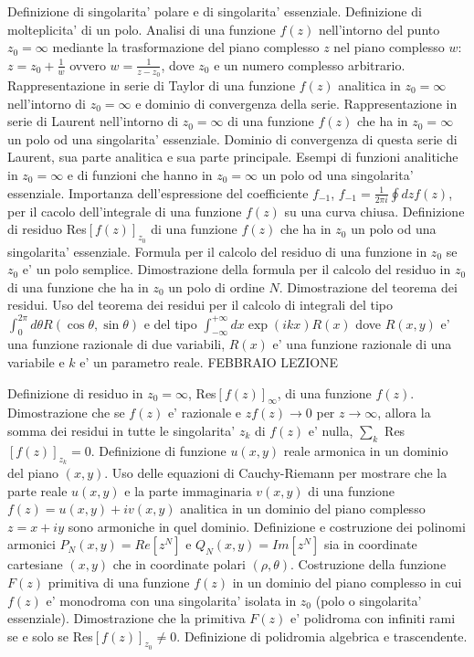 \documentclass[,12pt]{article}
\begin{document}
\noindent
Definizione di singolarita' polare e di singolarita' essenziale.
Definizione di molteplicita' di un polo. Analisi di una funzione
$f(z)$ nell'intorno del punto
$z_0=\infty$ mediante la trasformazione del piano complesso $z$ nel piano
complesso
$w$: $z=z_0+\frac{1}{w}$ ovvero $w=\frac{1}{z-z_0}$, dove $z_0$ e un
numero complesso arbitrario. Rappresentazione in serie di Taylor di una
funzione $f(z)$ analitica in $z_0=\infty$ nell'intorno di $z_0=\infty$ e
dominio di convergenza della serie. Rappresentazione in serie di Laurent
nell'intorno di $z_0=\infty$ di una funzione $f(z)$ che ha in $z_0=\infty$
un polo od una singolarita' essenziale. Dominio di convergenza di
questa serie di Laurent, sua parte analitica e sua parte principale.
Esempi di funzioni analitiche in $z_0=\infty$ e di funzioni che hanno
in $z_0=\infty$ un polo od una singolarita' essenziale. Importanza
dell'espressione del coefficiente $f_{-1}$, $f_{-1}=\frac{1}{2\pi
i}\oint dzf(z)$, per il cacolo dell'integrale di una funzione $f(z)$
su una curva chiusa. Definizione di residuo Res$[f(z)]_{z_0}$ di una
funzione $f(z)$ che ha in $z_0$ un polo od una singolarita'
essenziale. Formula per il calcolo del residuo di una funzione in
$z_0$ se $z_0$ e' un polo semplice. Dimostrazione della formula per
il calcolo del residuo in $z_0$ di una funzione che ha in $z_0$ un
polo di ordine $N$. Dimostrazione del teorema dei residui. Uso del
teorema dei residui per il calcolo di integrali del tipo $\int
_0^{2\pi}d\theta R(\cos\theta,\sin\theta)$ e del tipo
$\int_{-\infty}^{+\infty} dx \exp(ikx) R(x)$ dove $R(x,y)$ e' una
funzione razionale di due variabili, $R(x)$ e' una funzione razionale
di una variabile e $k$ e' un parametro reale.    
\vskip 20pt
 FEBBRAIO
\hskip 20pt
LEZIONE

\noindent
Definizione di residuo in $z_0=\infty$, Res$[f(z)]_{\infty}$, di una
funzione $f(z)$. Dimostrazione che se $f(z)$ e' razionale e
$zf(z)\rightarrow 0$ per $z\rightarrow \infty$, allora la somma dei
residui in tutte le singolarita' $z_k$ di $f(z)$ e' nulla, $\sum_k$
Res$[f(z)]_{z_k}=0$. Definizione di funzione $u(x,y)$ reale armonica in un
dominio del piano $(x,y)$. Uso delle equazioni di Cauchy-Riemann per
mostrare che la parte reale $u(x,y)$ e la parte immaginaria $v(x,y)$ di
una funzione $f(z)=u(x,y)+iv(x,y)$ analitica in un dominio del piano
complesso $z=x+iy$ sono armoniche in quel dominio. Definizione e
costruzione dei polinomi armonici $P_N(x,y)=Re[z^N]$ e $Q_N(x,y)=Im[z^N]$
sia in coordinate cartesiane $(x,y)$ che in coordinate polari
$(\rho,\theta)$. Costruzione della funzione $F(z)$ primitiva di una
funzione $f(z)$ in un dominio del piano complesso in cui $f(z)$ e'
monodroma con una singolarita' isolata in $z_0$ (polo o singolarita'
essenziale). Dimostrazione che la primitiva $F(z)$ e' polidroma con
infiniti rami se e solo se Res$[f(z)]_{z_0}\neq 0$. Definizione di
polidromia algebrica e trascendente. 
\end{document}
